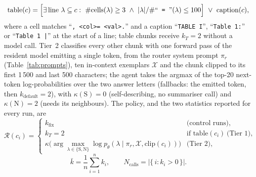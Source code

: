 \documentclass[pdflatex,sn-mathphys-num]{sn-jnl}
\theoremstyle{thmstyleone}%
\theoremstyle{thmstylethree}%
\begin{document}
\begin{equation}\label{eq:gate}
\mathrm{table}(c)=\Bigl[\exists\,\text{line }\lambda\subseteq c:\ \#\mathrm{cells}(\lambda)\ge 3 \ \wedge\ |\lambda|/\#\text{``\texttt{ = }''}(\lambda)\le 100\Bigr]\ \vee\ \mathrm{caption}(c),
\end{equation}
where a cell matches ``\texttt{, \textless col\textgreater = \textless val\textgreater.}'' and a caption ``\texttt{TABLE I}'', ``\texttt{Table 1:}'' or ``\texttt{Table 1 |}'' at the start of a line; table chunks receive $k_T=2$ without a model call. Tier~2 classifies every other chunk with one forward pass of the resident model emitting a single token, from the router system prompt $\pi_r$ (Table~\ref{tab:prompts}), ten in-context exemplars $\mathcal X$ and the chunk clipped to its first 1\,500 and last 500 characters; the agent takes the argmax of the top-20 next-token log-probabilities over the two answer letters (fallbacks: the emitted token, then $k_{\mathrm{default}}=2$), with $\kappa(\mathrm S)=0$ (self-describing, no summariser call) and $\kappa(\mathrm N)=2$ (needs its neighbours). The policy, and the two statistics reported for every run, are
\begin{equation}\label{eq:policy}
\mathcal R(c_i)=
\begin{cases}
k_{\mathrm{fix}} & \text{(control runs)},\\[2pt]
k_T=2 & \text{if } \mathrm{table}(c_i)\ \text{(Tier 1)},\\[2pt]
\kappa\bigl(\arg\max_{\lambda\in\{\mathrm S,\mathrm N\}}\log p_\theta(\lambda\mid \pi_r,\mathcal X,\mathrm{clip}(c_i))\bigr) & \text{(Tier 2)},
\end{cases}
\end{equation}
\begin{equation}\label{eq:kbar}
\bar k=\frac1n\sum_{i=1}^{n}k_i,\qquad N_{\mathrm{calls}}=\bigl|\{\,i : k_i>0\,\}\bigr| .
\end{equation}
\end{document}
